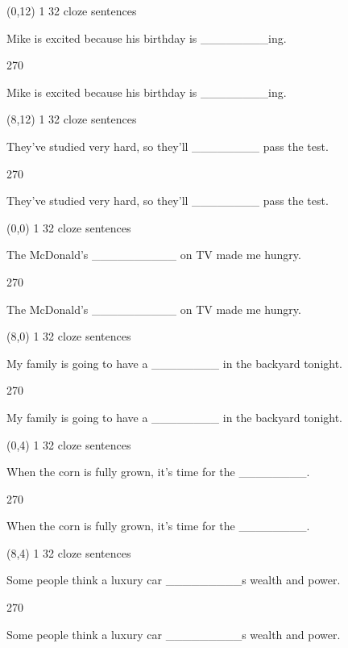 \documentclass[a4paper]{article}
\newenvironment{itemize*}%
{\begin{itemize}%
 \setlength{\itemsep}{0.5cm}%
 \setlength{\parsep}{0pt}%
 \setlength{\parskip}{0pt}}%
{\end{itemize}}
\newcommand{\mycard}[3]{%
	\small #1 #2
	\par
	\parbox[t][6.8cm][c]{9.5cm}{%
	\par
	\myleft{#3}
	\par
	\myright{#3}
	}
}
\newcommand{\myleft}[1]{%
	\begin{sideways}
	\hspace*{-0.9cm}
		\parbox[t][2.7cm][t]{6.5cm}{%
		\large #1
		}
	\end{sideways}
}
\newcommand{\myright}[1]{%
	\hspace*{6.5cm}
	\begin{turn}{270}
	\hspace*{-7.1cm}
		\parbox[t][2.7cm][t]{6.5cm}{%
		\large #1
		}
	\end{turn}
}
\begin{document}
\begin{textblock}{8}(0,12)
\mycard{1}{32 cloze sentences}{
\begin{itemize*}
\item Mike is excited because his birthday is \_\_\_\_\_\_\_\_ing.
\end{itemize*}
}
\end{textblock}

\begin{textblock}{8}(8,12)
\mycard{1}{32 cloze sentences}{
\begin{itemize*}
\item They've studied very hard, so they'll \_\_\_\_\_\_\_\_ pass the test.
\end{itemize*}
}
\end{textblock}

\null
\newpage

\begin{textblock}{8}(0,0)
\mycard{1}{32 cloze sentences}{
\begin{itemize*}
\item The McDonald's \_\_\_\_\_\_\_\_\_\_ on TV made me hungry.
\end{itemize*}
}
\end{textblock}

\begin{textblock}{8}(8,0)
\mycard{1}{32 cloze sentences}{
\begin{itemize*}
\item My family is going to have a \_\_\_\_\_\_\_\_ in the backyard tonight.
\end{itemize*}
}
\end{textblock}

\begin{textblock}{8}(0,4)
\mycard{1}{32 cloze sentences}{
\begin{itemize*}
\item When the corn is fully grown, it's time for the \_\_\_\_\_\_\_\_.
\end{itemize*}
}
\end{textblock}

\begin{textblock}{8}(8,4)
\mycard{1}{32 cloze sentences}{
\begin{itemize*}
\item Some people think a luxury car \_\_\_\_\_\_\_\_\_s wealth and power.
\end{itemize*}
}
\end{textblock}
\end{document}
